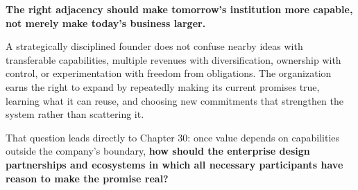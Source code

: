 \vspace{1em}
\begin{tcolorbox}[colback=black!5,colframe=black!75,arc=1mm,title=\textbf{The Final Principle}]
\textbf{The right adjacency should make tomorrow's institution more capable, not merely make today's business larger.}

\vspace{0.5em}
A strategically disciplined founder does not confuse nearby ideas with transferable capabilities, multiple revenues with diversification, ownership with control, or experimentation with freedom from obligations. The organization earns the right to expand by repeatedly making its current promises true, learning what it can reuse, and choosing new commitments that strengthen the system rather than scattering it.

That question leads directly to Chapter 30: once value depends on capabilities outside the company's boundary, \textbf{how should the enterprise design partnerships and ecosystems in which all necessary participants have reason to make the promise real?}
\end{tcolorbox}
